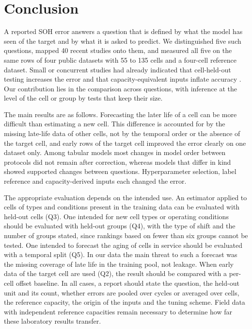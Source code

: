 \documentclass{ieeeaccess}
\begin{document}
\section{Conclusion}
\label{sec:conclusion}
A reported SOH error answers a question that is defined by what the model has seen of the target and by what it is asked to predict. We distinguished five such questions, mapped 40 recent studies onto them, and measured all five on the same rows of four public datasets with 55 to 135 cells and a four-cell reference dataset. Small or concurrent studies had already indicated that cell-held-out testing increases the error and that capacity-equivalent inputs inflate accuracy \cite{le2026,barua2026,maher2025,erdogan2026}. Our contribution lies in the comparison across questions, with inference at the level of the cell or group by tests that keep their size.

The main results are as follows. Forecasting the later life of a cell can be more difficult than estimating a new cell. This difference is accounted for by the missing late-life data of other cells, not by the temporal order or the absence of the target cell, and early rows of the target cell improved the error clearly on one dataset only. Among tabular models most changes in model order between protocols did not remain after correction, whereas models that differ in kind showed supported changes between questions. Hyperparameter selection, label reference and capacity-derived inputs each changed the error.

The appropriate evaluation depends on the intended use. An estimator applied to cells of types and conditions present in the training data can be evaluated with held-out cells (Q3). One intended for new cell types or operating conditions should be evaluated with held-out groups (Q4), with the type of shift and the number of groups stated, since rankings based on fewer than six groups cannot be tested. One intended to forecast the aging of cells in service should be evaluated with a temporal split (Q5). In our data the main threat to such a forecast was the missing coverage of late life in the training pool, not leakage. When early data of the target cell are used (Q2), the result should be compared with a per-cell offset baseline. In all cases, a report should state the question, the held-out unit and its count, whether errors are pooled over cycles or averaged over cells, the reference capacity, the origin of the inputs and the tuning scheme. Field data with independent reference capacities remain necessary to determine how far these laboratory results transfer.
\end{document}
